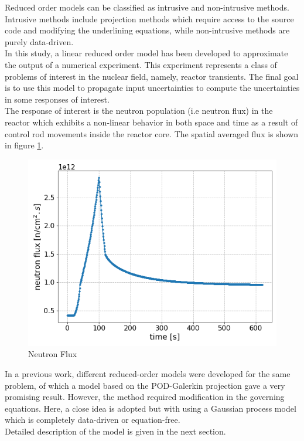 \documentclass{anstrans}
\begin{document}
Reduced order models can be classified as intrusive and non-intrusive methods. Intrusive methods include projection methods which require access to the source code and modifying the underlining equations, while non-intrusive methods are purely data-driven.\\
In this study, a linear reduced order model has been developed to approximate the output of a numerical experiment. This experiment represents a class of problems of interest in the nuclear field, namely, reactor transients. 
The final goal is to use this model to propagate input uncertainties to compute the uncertainties in some responses of interest.\\
The response of interest is the neutron population (i.e neutron flux) in the reactor which exhibits a non-linear behavior in both space and time as a result of control rod movements inside the reactor core. The spatial averaged flux is shown in figure \ref{fig:neutron flux}.\\
\begin{figure}
    \centering
    \includegraphics[scale=0.4]{./figs/ave_flux.png}
    \caption{Neutron Flux}
    \label{fig:neutron flux}
\end{figure}
In a previous work, different reduced-order models were developed for the same problem, of which a model based on the POD-Galerkin projection gave a very promising result. 
However, the method required modification in the governing equations.
Here, a close idea is adopted but with using a Gaussian process model which is completely data-driven or equation-free.\\
Detailed description of the model is given in the next section.
\end{document}
